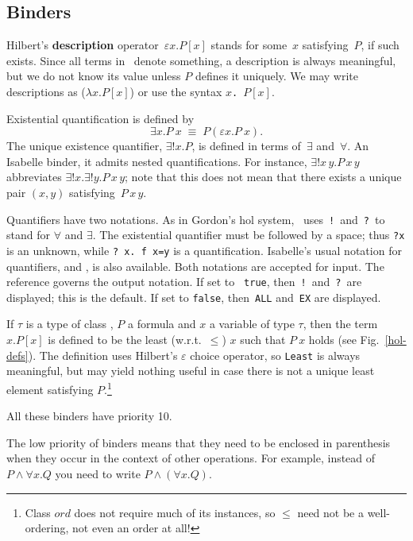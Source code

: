 \subsection{Binders}

Hilbert's {\bf description} operator~$\varepsilon x. P[x]$ stands for
some~$x$ satisfying~$P$, if such exists.  Since all terms in \HOL\ 
denote something, a description is always meaningful, but we do not
know its value unless $P$ defines it uniquely.  We may write
descriptions as ($\lambda x. P[x]$) or use the syntax
\hbox{\tt \at $x$.\ $P[x]$}.

Existential quantification is defined by
\[ \exists x. P~x \;\equiv\; P(\varepsilon x. P~x). \]
The unique existence quantifier, $\exists!x. P$, is defined in terms
of~$\exists$ and~$\forall$.  An Isabelle binder, it admits nested
quantifications.  For instance, $\exists!x\,y. P\,x\,y$ abbreviates
$\exists!x. \exists!y. P\,x\,y$; note that this does not mean that there
exists a unique pair $(x,y)$ satisfying~$P\,x\,y$.

Quantifiers have two notations.  As in Gordon's {\sc hol} system, \HOL\
uses~{\tt!}\ and~{\tt?}\ to stand for $\forall$ and $\exists$.  The
existential quantifier must be followed by a space; thus {\tt?x} is an
unknown, while \verb'? x. f x=y' is a quantification.  Isabelle's usual
notation for quantifiers, \sdx{ALL} and \sdx{EX}, is also
available.  Both notations are accepted for input.  The {\ML} reference
\ttindexbold{HOL_quantifiers} governs the output notation.  If set to {\tt
true}, then~{\tt!}\ and~{\tt?}\ are displayed; this is the default.  If set
to \texttt{false}, then~\texttt{ALL} and~\texttt{EX} are displayed.

If $\tau$ is a type of class \cldx{ord}, $P$ a formula and $x$ a
variable of type $\tau$, then the term ~$x. P[x]$ is defined
to be the least (w.r.t.\ $\le$) $x$ such that $P~x$ holds (see
Fig.~\ref{hol-defs}).  The definition uses Hilbert's $\varepsilon$
choice operator, so \texttt{Least} is always meaningful, but may yield
nothing useful in case there is not a unique least element satisfying
$P$.\footnote{Class $ord$ does not require much of its instances, so
  $\le$ need not be a well-ordering, not even an order at all!}

\medskip All these binders have priority 10.

\begin{warn}
The low priority of binders means that they need to be enclosed in
parenthesis when they occur in the context of other operations.  For example,
instead of $P \land \forall x. Q$ you need to write $P \land (\forall x. Q)$.
\end{warn}


